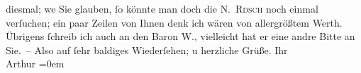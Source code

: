 \begin{ledgroupsized}[t]{13cm}
               diesmal; we{\geminationn} Sie glauben, ſo könnte man doch die \textsc{N. Rdsch} noch einmal {\pb}verſuchen; ein paar Zeilen von Ihnen
               denk ich wären von allergrößtem Werth. Übrigens ſchreib ich auch an den Baron W., vielleicht hat er eine andre Bitte an
               Sie. –\pend
           \pstart
           Also auf ſehr baldiges Wiederſehen; u herzliche Grüße.\pend
           \pstart
           Ihr{\\[\baselineskip]}\spacefill\mbox{Arthur}\pend
           \leftskip=0em{}
         
         \endnumbering{}\end{ledgroupsized}  \newcommand{\dateiname}{L01809}\newcommand{\titel}{Arthur Schnitzler an Hugo von Hofmannsthal, 26. 11. 1908}\newcommand{\editorInnen}{ Martin Anton Müller und Gerd-Hermann Susen}
      